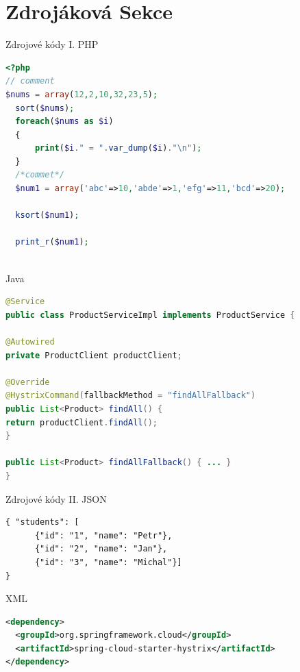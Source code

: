 \documentclass{beamer}							%
\begin{document}
\section{Zdrojáková Sekce}
\begin{frame}[fragile, shrink=20]{Zdrojové kódy I.}
	PHP
	\begin{lstlisting}[language=PHP]
<?php
// comment
$nums = array(12,2,10,32,23,5);
  sort($nums);
  foreach($nums as $i)
  {
      print($i." = ".var_dump($i)."\n");
  }
  /*commet*/
  $num1 = array('abc'=>10,'abde'=>1,'efg'=>11,'bcd'=>20);
  
  ksort($num1);
  
  print_r($num1);
     
\end{lstlisting}

	Java
	\begin{lstlisting}[language=Java]
@Service
public class ProductServiceImpl implements ProductService {

@Autowired
private ProductClient productClient;

@Override
@HystrixCommand(fallbackMethod = "findAllFallback")
public List<Product> findAll() {
return productClient.findAll();
}

public List<Product> findAllFallback() { ... }
}
\end{lstlisting}
\end{frame}
\begin{frame}[fragile, shrink=20]{Zdrojové kódy II.}
	JSON

	\begin{lstlisting}[language=XML]
{ "students": [
      {"id": "1", "name": "Petr"},
      {"id": "2", "name": "Jan"},
      {"id": "3", "name": "Michal"}]
}
\end{lstlisting}

	XML
	\begin{lstlisting}[language=XML]
<dependency>
  <groupId>org.springframework.cloud</groupId>
  <artifactId>spring-cloud-starter-hystrix</artifactId>
</dependency>
\end{lstlisting}
\end{frame}
\end{document}
